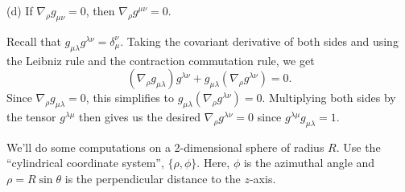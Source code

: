 \documentclass{../../templates/lkx_pset}
\begin{document}
\begin{parts}
	\begin{part}{(d)}
		If $\nabla_\rho g_{\mu\nu}=0$, then $\nabla_\rho g^{\mu\nu}=0$.
	\end{part}
	Recall that $g_{\mu\lambda}g^{\lambda\nu}=\delta_\mu^\nu$. Taking the covariant derivative of both sides and using the Leibniz rule and the contraction commutation rule, we get
	\[
		(\nabla_\rho g_{\mu\lambda})g^{\lambda\nu} + g_{\mu\lambda}(\nabla_\rho g^{\lambda\nu}) = 0.
	\]
	Since $\nabla_\rho g_{\mu\lambda}=0$, this simplifies to $g_{\mu\lambda}(\nabla_\rho g^{\lambda\nu})=0$. Multiplying both sides by the tensor $g^{\lambda\mu}$ then gives us the desired $\nabla_\rho g^{\lambda\nu}=0$ since $g^{\lambda\mu}g_{\mu\lambda}=1$.
\end{parts}

\begin{problem}{5}
We'll do some computations on a 2-dimensional sphere of radius $R$. Use the ``cylindrical coordinate system'', $\{\rho,\phi\}$. Here, $\phi$ is the azimuthal angle and $\rho=R\sin \theta$ is the perpendicular distance to the $z$-axis.
\end{problem}
\end{document}
